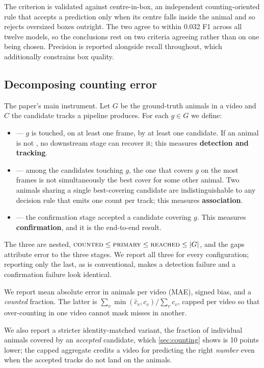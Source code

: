 The criterion is validated against centre-in-box, an independent counting-oriented rule that
accepts a prediction only when its centre falls inside the animal and so rejects oversized
boxes outright. The two agree to within 0.032 F1 across all twelve models, so the
conclusions rest on two criteria agreeing rather than on one being chosen. Precision is
reported alongside recall throughout, which additionally constrains box quality.

\subsection{Decomposing counting error}
\label{sec:decomposition}

The paper's main instrument. Let $G$ be the ground-truth animals in a video and $C$ the
candidate tracks a pipeline produces. For each $g\in G$ we define:

\begin{itemize}\itemsep2pt \parskip0pt
\item \reachedq --- $g$ is touched, on at least one frame, by at least one candidate. If
an animal is not \reachedq, no downstream stage can recover it; this measures
\textbf{detection and tracking}.
\item \primaryq --- among the candidates touching $g$, the one that covers $g$ on the most
frames is not simultaneously the best cover for some other animal. Two animals sharing a
single best-covering candidate are indistinguishable to any decision rule that emits one
count per track; this measures \textbf{association}.
\item \countedq --- the confirmation stage accepted a candidate covering $g$. This measures
\textbf{confirmation}, and it is the end-to-end result.
\end{itemize}

The three are nested, $\textsc{counted} \le \textsc{primary} \le \textsc{reached} \le |G|$, and the gaps
attribute error to the three stages. We report all three for every configuration; reporting
only the last, as is conventional, makes a detection failure and a confirmation failure look
identical.

We report mean absolute error in animals per video (MAE), signed bias, and a
\emph{counted} fraction. The latter is $\sum_v \min(\hat{c}_v, c_v) / \sum_v c_v$, capped
per video so that over-counting in one video cannot mask misses in another.

We also report a stricter identity-matched variant, the fraction of individual animals
covered by an \emph{accepted} candidate, which \cref{sec:counting} shows is 10 points
lower; the capped aggregate credits a video for predicting the right \emph{number} even
when the accepted tracks do not land on the animals.

